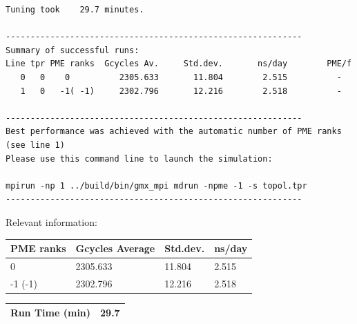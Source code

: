 \begin{lstlisting}[frame=single]
Tuning took    29.7 minutes.

------------------------------------------------------------
Summary of successful runs:
Line tpr PME ranks  Gcycles Av.     Std.dev.       ns/day        PME/f
   0   0    0          2305.633       11.804        2.515          -  
   1   0   -1( -1)     2302.796       12.216        2.518          -  

------------------------------------------------------------
Best performance was achieved with the automatic number of PME ranks (see line 1)
Please use this command line to launch the simulation:

mpirun -np 1 ../build/bin/gmx_mpi mdrun -npme -1 -s topol.tpr  
------------------------------------------------------------

\end{lstlisting}

Relevant information:
\begin{center}
    \begin{tabular}{|p{3.5cm}|p{3.5cm}|p{3.5cm}|p{3.5cm}|} \hline
         PME ranks & Gcycles Average & Std.dev. & ns/day \\ \hline
         0 & 2305.633  & 11.804  & 2.515  \\ \hline
         -1 (-1) & 2302.796 & 12.216 & 2.518  \\ \hline
    \end{tabular}
    \begin{tabular}{|p{3.5cm}|p{11.4cm}|} \hline
         Run Time (min) & 29.7 \\ \hline
    \end{tabular}
\end{center}

